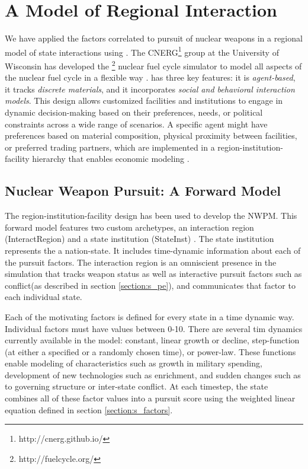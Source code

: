 \section{A \Cyclus Model of Regional Interaction}
\label{s_methods}

We have applied the factors correlated to pursuit of nuclear weapons in a regional model of state interactions using \Cyclus\cite{huff_open_2011,huff_fundamental_2016,gidden_agent-based_2013}.  The \gls{CNERG}\footnote{http://cnerg.github.io/} group at the University of Wisconsin has developed the \Cyclus\footnote{http://fuelcycle.org/} nuclear fuel cycle simulator to model all aspects of the nuclear fuel cycle in a flexible way \cite{cyclus_v1_3}.  \Cyclus has three key features: it is \textit{agent-based}, it tracks \textit{discrete materials}, and it incorporates \textit{social and behavioral interaction models}\cite{jennings_agent-based_2000, taylor2014agent}. This design allows customized facilities and institutions to engage in dynamic decision-making based on their preferences, needs, or political constraints across a wide range of scenarios.  A specific agent might have preferences based on material composition, physical proximity between facilities, or preferred trading partners, which are implemented in a region-institution-facility hierarchy that enables economic modeling \cite{oliver_geniusv2:_2009}.

\subsection{Nuclear Weapon Pursuit: A Forward Model}

The region-institution-facility design has been used to develop the \gls{NWPM}. This forward model features two custom archetypes, an interaction region (InteractRegion) and a state institution (StateInst) .  The state institution represents the a nation-state.  It includes time-dynamic information about each of the pursuit factors. The interaction region is an omniscient presence in the simulation that tracks weapon status as well as interactive pursuit factors such as conflict(as described in section \ref{section:s_pe}), and communicates that factor to each individual state. 

Each of the motivating factors is defined for every state in a time dynamic way. Individual factors must have values between 0-10. There are several tim dynamics currently available in the model: constant, linear growth or decline, step-function (at either a specified or a randomly chosen time), or power-law.  These functions enable modeling of characteristics such as growth in military spending, development of new technologies such as enrichment, and sudden changes such as to governing structure or inter-state conflict.  At each timestep, the state combines all of these factor values into a pursuit score using the weighted linear equation defined in section \ref{section:s_factors}.

